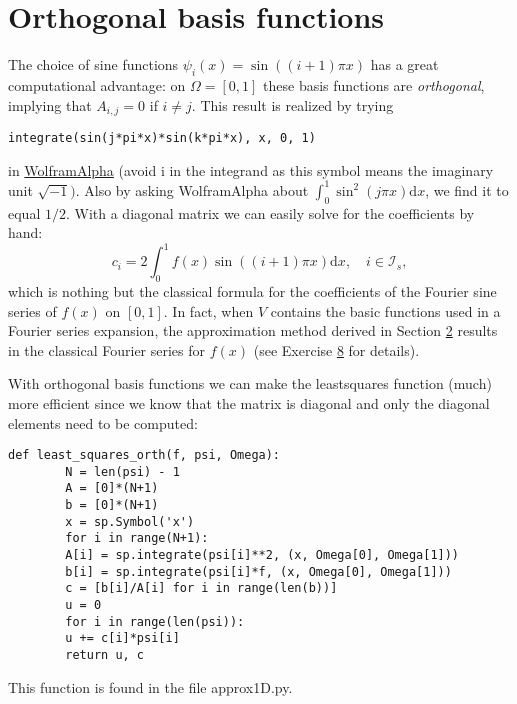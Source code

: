 \documentclass[../main.tex]{subfiles}
\begin{document}
	\section[Orthogonal basis functions]{Orthogonal basis functions}
	\label{sec:sec_2_8}
	The choice of sine functions $\psi_{i}(x)=\sin ((i+1) \pi x)$ has a great computational advantage: on $\Omega=[0,1]$ these basis functions are \textit{orthogonal}, implying that $A_{i, j}=0$ if $i \neq j$. This result is realized by trying
	\begin{lstlisting}[numbers=none]
		integrate(sin(j*pi*x)*sin(k*pi*x), x, 0, 1)
	\end{lstlisting}
	in \href{https://www.wolframalpha.com/}{WolframAlpha} (avoid i in the integrand as this symbol means the imaginary unit $\sqrt{-1})$. Also by asking WolframAlpha about $\int_{0}^{1} \sin ^{2}(j \pi x) \mathrm{d} x$, we find it to equal $1 / 2$. With a diagonal matrix we can easily solve for the coefficients by hand:
	\begin{equation}\label{eqa41}
		c_{i}=2 \int_{0}^{1} f(x) \sin ((i+1) \pi x) \mathrm{d} x, \quad i \in \mathcal{I}_{s},
	\end{equation}
	which is nothing but the classical formula for the coefficients of the Fourier sine series of $f(x)$ on $[0,1]$. In fact, when $V$ contains the basic functions used in a Fourier series expansion, the approximation method derived in Section \hyperref[chap:chap_2]{2} results in the classical Fourier series for $f(x)$ (see Exercise \hyperref[sec:sec_10_8]{8} for details).
	
	With orthogonal basis functions we can make the least\textunderscore squares function (much) more efficient since we know that the matrix is diagonal and only the diagonal elements need to be computed:
	\begin{lstlisting}[numbers=none]
		def least_squares_orth(f, psi, Omega):
		N = len(psi) - 1
		A = [0]*(N+1)
		b = [0]*(N+1)
		x = sp.Symbol('x')
		for i in range(N+1):
		A[i] = sp.integrate(psi[i]**2, (x, Omega[0], Omega[1]))
		b[i] = sp.integrate(psi[i]*f, (x, Omega[0], Omega[1]))
		c = [b[i]/A[i] for i in range(len(b))]
		u = 0
		for i in range(len(psi)):
		u += c[i]*psi[i]
		return u, c
	\end{lstlisting}
	This function is found in the file approx1D.py.
\end{document}
